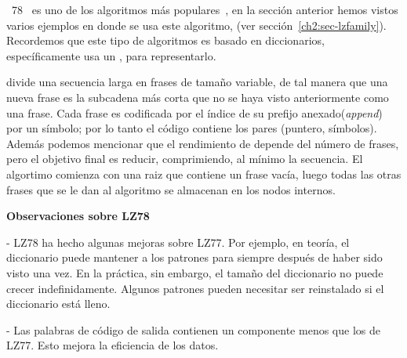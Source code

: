 % 
% 
%
%

\lempelziv~78~\cite{ZivLempel1978} es uno de los algoritmos \losslessdatacompression más populares~\cite{Begleiter2004}, en la sección anterior hemos vistos varios ejemplos en donde se usa este algoritmo, (ver sección~\ref{ch2:sec-lzfamily}). Recordemos que este tipo de algoritmos es basado en diccionarios, específicamente usa un \trie, para representarlo. 

\lzSieteOcho divide una secuencia larga en frases de tamaño variable, de tal manera que una nueva frase es la subcadena más corta que no se haya visto anteriormente como una frase. Cada frase es codificada por el índice de su prefijo anexado(\emph{append}) por un símbolo; por lo tanto el código \lzSieteOcho contiene los pares (puntero, símbolos). Además podemos mencionar que el  rendimiento de \lzSieteOcho depende del número de frases, pero el objetivo final es reducir, comprimiendo, al mínimo la secuencia. El algortimo comienza con una raiz que contiene un frase vacía, luego todas las otras frases que se le dan al algoritmo se almacenan en los nodos internos.










\textbf{Observaciones sobre LZ78}


- LZ78 ha hecho algunas mejoras sobre LZ77. 
Por ejemplo, en teoría, el diccionario puede mantener a los 
patrones para siempre después de haber sido visto una vez. 
En la práctica, sin embargo, el tamaño del diccionario 
no puede crecer indefinidamente. 
Algunos patrones pueden necesitar ser reinstalado si el diccionario está lleno.

- Las palabras de código de salida contienen un componente 
menos que los de LZ77. Esto mejora la eficiencia de los datos.





 


